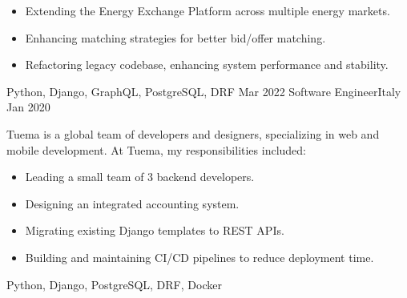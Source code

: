 \begin{experiences}
{\begin{itemize}
      \item Extending the Energy Exchange Platform across multiple energy markets.
      \item Enhancing matching strategies for better bid/offer matching.
      \item Refactoring legacy codebase, enhancing system performance and stability.
    \end{itemize}
  }
  {Python, Django, GraphQL, PostgreSQL, DRF}
  \emptySeparator
  \experience
  {Mar 2022} {Software Engineer}{}{Italy}
  {Jan 2020} {
    Tuema is a global team of developers and designers, specializing in web and mobile development.
    At Tuema, my responsibilities included:
    \begin{itemize}
      \item Leading a small team of 3 backend developers.
      \item Designing an integrated accounting system.
      \item Migrating existing Django templates to REST APIs.
      \item Building and maintaining CI/CD pipelines to reduce deployment time.
    \end{itemize}
  }
  {Python, Django, PostgreSQL, DRF, Docker}
  \emptySeparator
\end{experiences}

